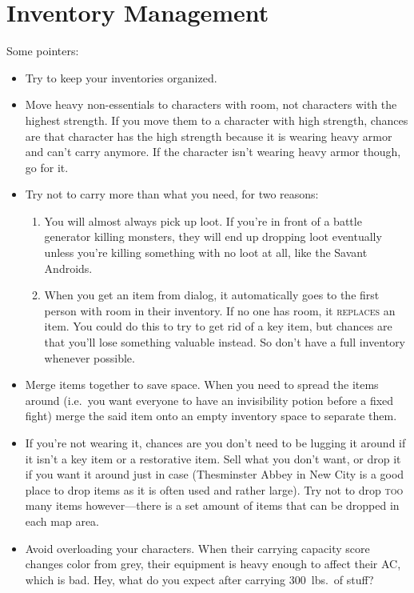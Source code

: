\documentclass[10pt,twoside,openright]{report}
\newcommand{\WviiNeedSpace}{\Needspace*{4\baselineskip+\parskip}}
\DeclareRobustCommand{\indexPlace}[1]{\index[places]{#1}}
\DeclareRobustCommand{\place}[1]{\texorpdfstring{#1\indexPlace{#1}}{#1}}
\newcommand\textlcsc[1]{\texorpdfstring{\textsc{\MakeLowercase{#1}}}{#1}}
\begin{document}
\section{Inventory Management}\label{inventory-management}%
%
\WviiNeedSpace{}Some pointers:%
\begin{itemize}[leftmargin=*]
\item
  Try to keep your inventories organized.
\item
  Move heavy non-essentials to characters with room, not characters with
  the highest strength. If you move them to a character with high
  strength, chances are that character has the high strength because it
  is wearing heavy armor and can't carry anymore. If the character isn't
  wearing heavy armor though, go for it.
\item
  Try not to carry more than what you need, for two reasons:

  \begin{enumerate}
  \def\labelenumi{\arabic{enumi}.}
  \item
    You will almost always pick up loot. If you're in front of a battle
    generator killing monsters, they will end up dropping loot
    eventually unless you're killing something with no loot at all, like
    the Savant Androids.
  \item
    When you get an item from dialog, it automatically goes to the first
    person with room in their inventory. If no one has room, it
    \textlcsc{REPLACES} an item. You could do this to try to get rid of a key
    item, but chances are that you'll lose something valuable instead. So
    don't have a full inventory whenever possible.
  \end{enumerate}
\item
  Merge items together to save space. When you need to spread the items
  around (i.e.\ you want everyone to have an invisibility potion before a
  fixed fight) merge the said item onto an empty inventory space to
  separate them.
\item
  If you're not wearing it, chances are you don't need to be lugging it
  around if it isn't a key item or a restorative item. Sell what you don't
  want, or drop it if you want it around just in case (Thesminster Abbey in
  \place{New City} is a good place to drop items as it is often used and
  rather large). Try not to drop \textlcsc{TOO} many items however---there is
  a set amount of items that can be dropped in each map area.
\item
  Avoid overloading your characters. When their carrying capacity score
  changes color from grey, their equipment is heavy enough to affect their
  AC, which is bad. Hey, what do you expect after carrying 300~lbs.\ of
  stuff?
\end{itemize}
\end{document}
